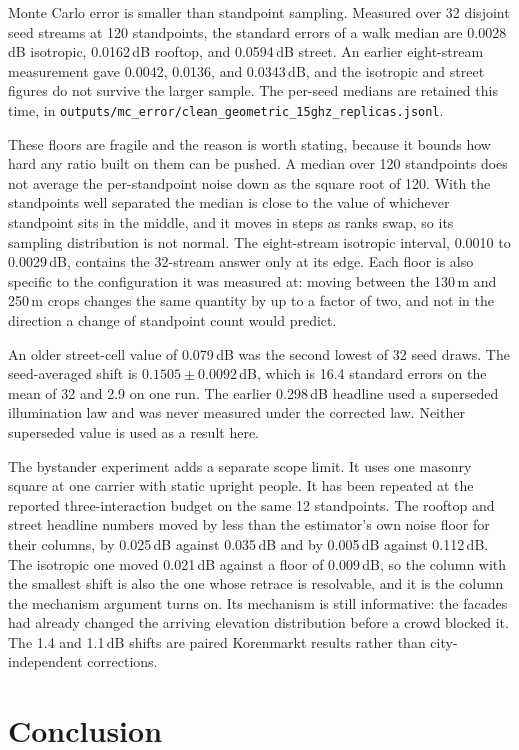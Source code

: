 \documentclass[journal]{IEEEtran}
\begin{document}
Monte Carlo error is smaller than standpoint sampling. Measured over 32 disjoint
seed streams at 120 standpoints, the standard errors of a walk median are
0.0028\,dB isotropic, 0.0162\,dB rooftop, and 0.0594\,dB street. An earlier
eight-stream measurement gave 0.0042, 0.0136, and 0.0343\,dB, and the isotropic
and street figures do not survive the larger sample. The per-seed medians are
retained this time, in
\texttt{outputs/mc\_error/clean\_geometric\_15ghz\_replicas.jsonl}.

These floors are fragile and the reason is worth stating, because it bounds how
hard any ratio built on them can be pushed. A median over 120 standpoints does
not average the per-standpoint noise down as the square root of 120. With the
standpoints well separated the median is close to the value of whichever
standpoint sits in the middle, and it moves in steps as ranks swap, so its
sampling distribution is not normal. The eight-stream isotropic interval,
0.0010 to 0.0029\,dB, contains the 32-stream answer only at its edge. Each floor
is also specific to the configuration it was measured at: moving between the
130\,m and 250\,m crops changes the same quantity by up to a factor of two, and
not in the direction a change of standpoint count would predict.

An older street-cell value of 0.079\,dB was the second lowest of 32 seed draws.
The seed-averaged shift is $0.1505 \pm 0.0092$\,dB, which is 16.4 standard errors
on the mean of 32 and 2.9 on one run. The earlier 0.298\,dB headline used a
superseded illumination law and was never measured under the corrected law.
Neither superseded value is used as a result here.

The bystander experiment adds a separate scope limit. It uses one masonry square
at one carrier with static upright people. It has been repeated at the reported
three-interaction budget on the same 12 standpoints. The rooftop and street
headline numbers moved by less than the estimator's own noise floor for their
columns, by 0.025\,dB against 0.035\,dB and by 0.005\,dB against 0.112\,dB. The
isotropic one moved 0.021\,dB against a floor of 0.009\,dB, so the column with
the smallest shift is also the one whose retrace is resolvable, and it is the
column the mechanism argument turns on. Its mechanism
is still informative: the facades had already changed the arriving elevation
distribution before a crowd blocked it. The 1.4 and 1.1\,dB shifts are paired
Korenmarkt results rather than city-independent corrections.

\section{Conclusion}
\label{sec:conclusion}
\end{document}
